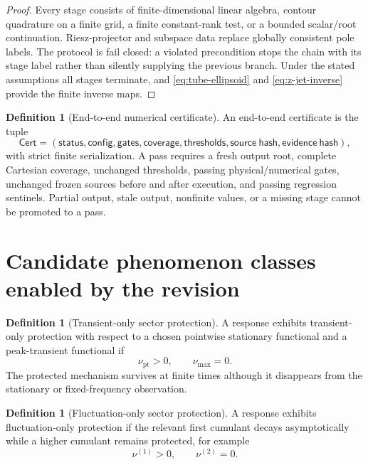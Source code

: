 \documentclass[11pt]{article}
\theoremstyle{definition}
\newtheorem{definition}[theorem]{Definition}
\theoremstyle{remark}
\begin{document}
\begin{proof}
Every stage consists of finite-dimensional linear algebra, contour quadrature on a finite grid, a finite constant-rank test, or a bounded scalar/root continuation.  Riesz-projector and subspace data replace globally consistent pole labels.  The protocol is fail closed: a violated precondition stops the chain with its stage label rather than silently supplying the previous branch.  Under the stated assumptions all stages terminate, and \eqref{eq:tube-ellipsoid} and \eqref{eq:z-jet-inverse} provide the finite inverse maps.
\end{proof}

\begin{definition}[End-to-end numerical certificate]\label{def:e2e-certificate}
An end-to-end certificate is the tuple
\begin{equation}
 \mathsf{Cert}
 =(\mathsf{status},\mathsf{config},\mathsf{gates},
 \mathsf{coverage},\mathsf{thresholds},
 \mathsf{source\ hash},\mathsf{evidence\ hash}),
 \label{eq:e2e-certificate}
\end{equation}
with strict finite serialization.  A pass requires a fresh output root, complete Cartesian coverage, unchanged thresholds, passing physical/numerical gates, unchanged frozen sources before and after execution, and passing regression sentinels.  Partial output, stale output, nonfinite values, or a missing stage cannot be promoted to a pass.
\end{definition}

\section{Candidate phenomenon classes enabled by the revision}

\begin{definition}[Transient-only sector protection]\label{def:transient-only}
A response exhibits transient-only protection with respect to a chosen pointwise stationary functional and a peak-transient functional if
\begin{equation}
\nu_{\mathrm{pt}}>0,
\qquad
\nu_{\max}=0.
\label{eq:transient-only}
\end{equation}
The protected mechanism survives at finite times although it disappears from the stationary or fixed-frequency observation.
\end{definition}

\begin{definition}[Fluctuation-only sector protection]\label{def:fluctuation-only}
A response exhibits fluctuation-only protection if the relevant first cumulant decays asymptotically while a higher cumulant remains protected, for example
\begin{equation}
\nu^{(1)}>0,
\qquad
\nu^{(2)}=0.
\label{eq:fluctuation-only}
\end{equation}
\end{definition}
\end{document}
